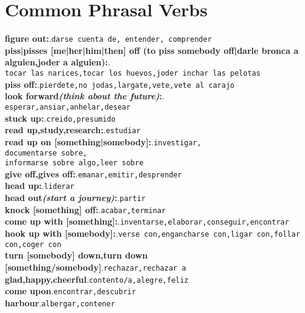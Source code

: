 \documentclass[twocolumn]{article}
\begin{document}
  \section{Common Phrasal Verbs}
  \textbf{figure out:}.\texttt{darse cuenta de, entender, comprender}\\
  \textbf{piss|pisses [me|her|him|then] off (to piss somebody off|darle bronca a alguien,joder a alguien):}.\\\texttt{tocar las narices,tocar los huevos,joder inchar las pelotas}\\
  \textbf{piss off:}.\texttt{pierdete,no jodas,largate,vete,vete al carajo}\\
  \textbf{look forward{\scriptsize \textsl{(think about the future)}}:}.\\\texttt{esperar,ansiar,anhelar,desear}\\
  \textbf{stuck up:}.\texttt{creido,presumido}\\
  \textbf{read up,study,research:}.\texttt{estudiar}\\
  \textbf{read up on [something|somebody]:}.\texttt{investigar,\\documentarse sobre,\\informarse sobre algo,leer sobre}\\
  \textbf{give off,gives off:}.\texttt{emanar,emitir,desprender}\\
  \textbf{head up:}.\texttt{liderar}\\
  \textbf{head out{\scriptsize \textsl{(start a journey)}}:}.\texttt{partir}\\
  \textbf{knock [something] off:}.\texttt{acabar,terminar}\\
  \textbf{come up with [something]:}.\texttt{inventarse,elaborar,conseguir,encontrar}\\
  \textbf{hook up with [somebody]:}.\texttt{verse con,engancharse con,ligar con,follar con,coger con}\\
  \textbf{turn [somebody] down,turn down [something/somebody]}.\texttt{rechazar,rechazar a}\\
  \textbf{glad,happy,cheerful}.\texttt{contento/a,alegre,feliz}\\
  \textbf{come upon}.\texttt{encontrar,descubrir}\\
  \textbf{harbour}.\texttt{albergar,contener}\\
\end{document}
